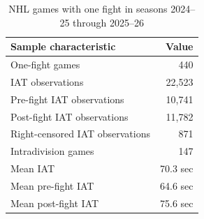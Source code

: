 \begin{table}[htbp]
\centering
\caption{NHL games with one fight in seasons 2024--25 through 2025--26}
\label{tab:one_fight_sample_20242025_20252026}
\scriptsize
\renewcommand{\arraystretch}{1.12}
\setlength{\tabcolsep}{5pt}

\begin{tabular*}{0.78\textwidth}{@{\extracolsep{\fill}}lr}
\toprule
Sample characteristic & Value \\
\midrule
One-fight games & 440 \\
IAT observations & 22,523 \\
Pre-fight IAT observations & 10,741 \\
Post-fight IAT observations & 11,782 \\
Right-censored IAT observations & 871 \\
Intradivision games & 147 \\
Mean IAT & 70.3 sec \\
Mean pre-fight IAT & 64.6 sec \\
Mean post-fight IAT & 75.6 sec \\
\bottomrule
\end{tabular*}
\end{table}
